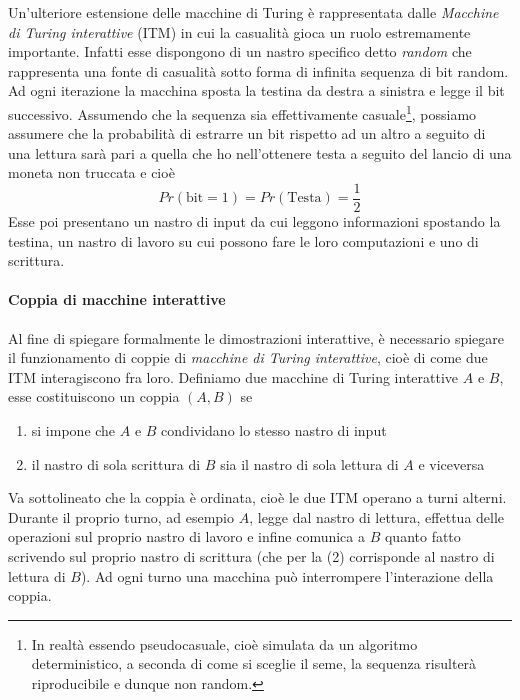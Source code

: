 \documentclass{article}
\theoremstyle{definition}
\begin{document}
Un'ulteriore estensione delle macchine di Turing è rappresentata dalle \emph{Macchine di Turing interattive} (ITM) in cui la casualità gioca un ruolo estremamente importante.
Infatti esse dispongono di un nastro specifico detto \emph{random} che rappresenta una fonte di casualità sotto forma di infinita sequenza di bit random. Ad ogni iterazione la macchina sposta la testina da destra a sinistra e legge il bit successivo. Assumendo che la sequenza sia effettivamente casuale\footnote{In realtà essendo pseudocasuale, cioè simulata da un algoritmo deterministico, a seconda di come si sceglie il seme, la sequenza risulterà riproducibile e dunque non random.}, possiamo assumere che la probabilità di estrarre un bit rispetto ad un altro a seguito di una lettura sarà pari a quella che ho nell'ottenere testa a seguito del lancio di una moneta non truccata e cioè
\begin{equation*}
    Pr\left(\text{bit} = 1\right) = Pr\left(\text{Testa}\right) = \frac{1}{2}
\end{equation*}
Esse poi presentano un nastro di input da cui leggono informazioni spostando la testina, un nastro di lavoro su cui possono fare le loro computazioni e uno di scrittura.

\paragraph{Coppia di macchine interattive}
Al fine di spiegare formalmente le dimostrazioni interattive, è necessario spiegare il funzionamento di coppie di \emph{macchine di Turing interattive}, cioè di come due ITM interagiscono fra loro. Definiamo due macchine di Turing interattive $A$ e $B$, esse costituiscono un coppia $(A, B)$ se
\begin{enumerate}
    \item si impone che $A$ e $B$ condividano lo stesso nastro di input 
    \item il nastro di sola scrittura di $B$ sia il nastro di sola lettura di $A$ e viceversa
\end{enumerate}
Va sottolineato che la coppia è ordinata, cioè le due ITM operano a turni alterni. Durante il proprio turno, ad esempio $A$, legge dal nastro di lettura, effettua delle operazioni sul proprio nastro di lavoro e infine comunica a $B$ quanto fatto scrivendo sul proprio nastro di scrittura (che per la (2) corrisponde al nastro di lettura di $B$).
Ad ogni turno una macchina può interrompere l'interazione della coppia.
\end{document}
